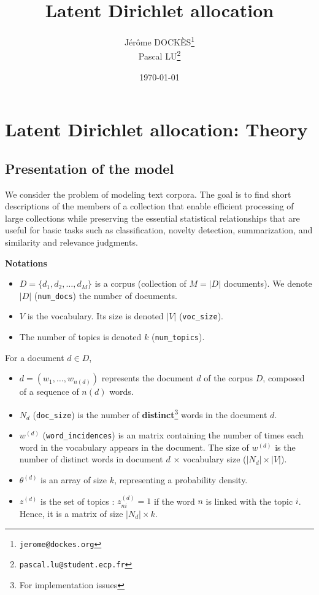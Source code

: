 \documentclass[10pt]{article}
\title{Latent Dirichlet allocation}
\date{\today}
\author{J\'er\^ome DOCK\`ES\footnote{\texttt{jerome@dockes.org}} \\ Pascal LU\footnote{\texttt{pascal.lu@student.ecp.fr}}}
\begin{document}
\maketitle

\section{Latent Dirichlet allocation: Theory}
\subsection{Presentation of the model}

We consider the problem of modeling text corpora. The goal is to find short descriptions of the members of a collection that enable efficient processing of large collections while preserving the essential statistical relationships that are useful for basic tasks such as classification, novelty detection, summarization, and similarity and relevance judgments.

\medskip

\textbf{Notations}
\begin{itemize}
\setlength\itemsep{-0.2em}
  \item $D = \{d_{1},d_{2}, \ldots, d_{M}\}$ is a corpus (collection of $M=|D|$ documents). We denote $|D|$ (\verb"num_docs") the number of documents.
  \item $V$ is the vocabulary. Its size is denoted $|V|$ (\verb"voc_size").
  \item The number of topics is denoted $k$ (\verb"num_topics").
\end{itemize}

For a document $d \in D$,
\begin{itemize}  
\setlength\itemsep{-0.2em}
  \item $d = (w_1, \ldots, w_{n(d)})$ represents the document $d$ of the corpus $D$, composed of a sequence of $n(d)$ words.
  \item $N_d$ (\verb"doc_size") is the number of \textbf{distinct}\footnote{For implementation issues} words in the document $d$.
  \item $w^{(d)}$ (\verb"word_incidences") is an matrix containing the number of times each word in the vocabulary appears in the document. The size of $w^{(d)}$ is the number of distinct words in document $d$ $\times$ vocabulary size ($|N_d| \times |V|$).
 \item $\theta^{(d)}$ is an array of size $k$, representing a probability density.
 \item $z^{(d)}$ is the set of topics : $z_{ni}^{(d)} =  1$ if the word $n$ is linked with the topic $i$. Hence, it is a matrix of size $|N_d| \times k$.
\end{itemize}
\end{document}
